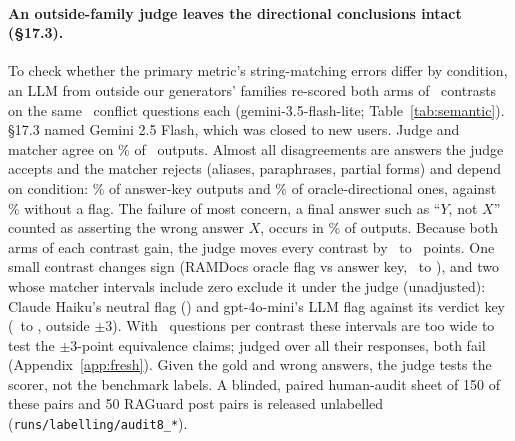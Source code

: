 \paragraph{An outside-family judge leaves the directional conclusions intact (\S17.3).} To
check whether the primary metric's string-matching errors differ by condition, an LLM from outside our generators' families re-scored both
arms of \semK\ contrasts on the same \semNq\ conflict questions each (gemini-3.5-flash-lite; Table~\ref{tab:semantic}).
\S17.3 named Gemini 2.5 Flash, which was closed to new users. Judge and matcher agree on \semAgree\% of \semN\ outputs. Almost all
disagreements are answers the judge accepts and the matcher rejects (aliases, paraphrases, partial forms) and
depend on condition: \semJudgeOnlyKey\% of answer-key outputs and \semJudgeOnlyDir\% of oracle-directional ones,
against \semJudgeOnlyPlain\% without a flag. The failure of most concern, a final answer such as
``$Y$, not $X$'' counted as asserting the wrong answer $X$, occurs in \semRejected\% of outputs. Because
both arms of each contrast gain, the judge moves every contrast by \semDidMin\ to \semDidMax\ points. One small contrast changes sign (RAMDocs oracle flag vs answer key, \semTwentyThreeRDMiniM\ to \semTwentyThreeRDMiniJ), and
two whose matcher intervals include zero exclude it under the judge (unadjusted): Claude Haiku's neutral flag
(\semNeuCBsHaikuJ) and gpt-4o-mini's LLM flag against its verdict key (\semThirtyCBsMiniM\ to \semThirtyCBsMiniJ, outside $\pm$3). With \semNq\ questions per contrast these
intervals are too wide to test the $\pm$3-point equivalence claims; judged over all their responses, both fail
(Appendix~\ref{app:fresh}). Given
the gold and wrong answers, the judge tests the scorer, not the benchmark labels. A blinded, paired human-audit sheet of
150 of these pairs and 50 RAGuard post pairs is released unlabelled (\texttt{runs/labelling/audit8\_*}).


